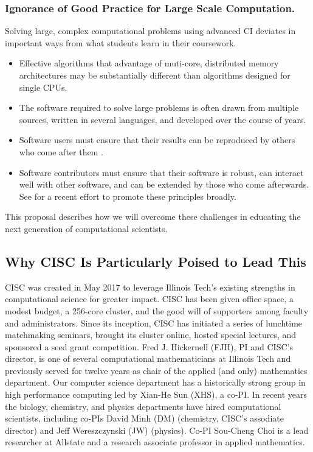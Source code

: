 \documentclass[11pt]{NSFamsart}
\begin{document}
\subsubsection*{Ignorance of Good Practice for Large Scale Computation.}  Solving large, complex computational problems using advanced CI deviates in important ways from what students learn in their coursework. 

\begin{itemize}

\item Effective algorithms that advantage of muti-core, distributed memory architectures may be substantially different than algorithms designed for single CPUs.

\item The software required to solve large problems is often drawn from multiple sources, written in several languages, and developed over the course of years.

\item Software users must ensure that their results can be reproduced by others who come after them \cite{Pen11}.  

\item Software contributors must ensure that their software is robust, can interact well with other software, and can be extended by those who come afterwards.  See \cite{BSS18} for a recent effort to promote these principles broadly.

\end{itemize}

This proposal describes how we will overcome these challenges in educating the next generation of computational scientists.

\subsection{Why CISC Is Particularly Poised to Lead This}
CISC was created in May 2017 to leverage Illinois Tech’s existing strengths in computational science for greater impact.  CISC has been given office space, a modest budget, a 256-core cluster, and the good will of supporters among faculty and administrators.  Since its inception, CISC has initiated a series of lunchtime matchmaking seminars, brought its cluster online, hosted special lectures, and sponsored a seed grant competition. Fred J. Hickernell (FJH), PI and CISC’s director, is one of several computational mathematicians at Illinois Tech and previously served for twelve years as chair of the applied (and only) mathematics department.  Our computer science department has a historically strong group in high performance computing led by Xian-He Sun (XHS), a co-PI.  In recent years the biology, chemistry, and physics departments have hired computational scientists, including co-PIs David Minh (DM) (chemistry, CISC's assodiate director) and Jeff Wereszczynski (JW) (physics).  Co-PI Sou-Cheng Choi is a lead researcher at Allstate and a research associate professor in applied mathematics.
\end{document}
